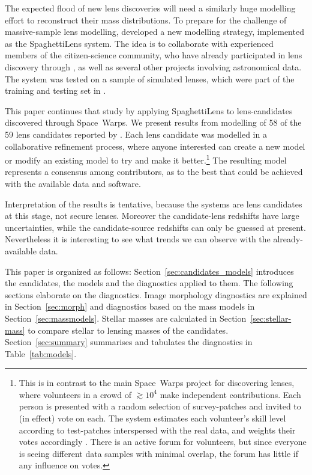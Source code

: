 The expected flood of new lens discoveries will need a similarly huge
modelling effort to reconstruct their mass distributions.  To prepare
for the challenge of massive-sample lens modelling,
\cite{2015MNRAS.447.2170K} developed a new modelling strategy,
implemented as the SpaghettiLens system.  The idea is to collaborate
with experienced members of the citizen-science community, who have
already participated in lens discovery through \SW, as well as several
other projects involving astronomical data.  The system was tested on
a sample of simulated lenses, which were part of the training and
testing set in \SW.

This paper continues that study by applying SpaghettiLens to
lens-candidates discovered through Space~Warps.  We present results
from modelling of 58 of the 59 lens candidates reported by
\cite{2016MNRAS.455.1191M}.  Each lens candidate was modelled in a
collaborative refinement process, where anyone interested can create a
new model or modify an existing model to try and make it
better.\footnote{This is in contrast to the main Space~Warps project
  for discovering lenses, where volunteers in a crowd of $\gtrsim10^4$
  make independent contributions.  Each person is presented with a
  random selection of survey-patches and invited to (in effect) vote
  on each.  The system estimates each volunteer's skill level
  according to test-patches interspersed with the real data, and
  weights their votes accordingly \citep{2016MNRAS.455.1171M}.  There
  is an active forum for volunteers, but since everyone is seeing
  different data samples with minimal overlap, the forum has little if
  any influence on votes.}  The resulting model represents a consensus
among contributors, as to the best that could be achieved with the
available data and software.

Interpretation of the results is tentative,
because the systems are lens candidates at this stage, not secure lenses.
Moreover the candidate-lens redshifts have large uncertainties, while
the candidate-source redshifts can only be guessed at present.
Nevertheless it is interesting to see what trends we can observe with
the already-available data.

This paper is organized as follows:
Section~\ref{sec:candidates_models} introduces the candidates, the models and the diagnostics applied to them.
The following sections elaborate on the diagnostics.
Image morphology diagnostics are explained in Section~\ref{sec:morph} and
diagnostics based on the mass models in Section~\ref{sec:massmodels}.
Stellar masses are calculated in Section~\ref{sec:stellar-mass} to compare stellar to lensing masses of the candidates.
Section~\ref{sec:summary} summarises and tabulates the diagnostics in
Table~\ref{tab:models}.

